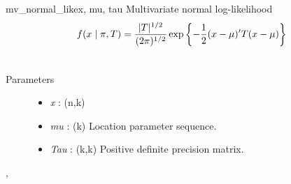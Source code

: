 \hypertarget{pymc.distributions.mv_normal_like}{}\begin{funcdesc}{mv\_normal\_like}{x, mu, tau}
Multivariate normal log-likelihood
\begin{gather}
\begin{split}f(x \mid \pi, T) = \frac{|T|^{1/2}}{(2\pi)^{1/2}} \exp\left\{ -\frac{1}{2} (x-\mu)^{\prime}T(x-\mu) \right\}\end{split}\notag\\\begin{split}\end{split}\notag
\end{gather}\begin{description}
\item[Parameters] \leavevmode\begin{itemize}
\item {} 
\emph{x} : (n,k)

\item {} 
\emph{mu} : (k) Location parameter sequence.

\item {} 
\emph{Tau} : (k,k) Positive definite precision matrix.

\end{itemize}

\end{description}




\hyperlink{pymc.distributions.mv_normal_chol_like}{}, \hyperlink{pymc.distributions.mv_normal_cov_like}{}


\end{funcdesc}

